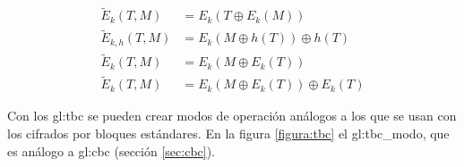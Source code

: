 \begin{align}
  \label{tbc_trivial}
  \tilde{E}_k(T, M) &= E_k(T \oplus E_k(M)) \\
  \label{tbc_lrw}
  \tilde{E}_{k, h}(T, M) &= E_k(M \oplus h(T)) \oplus h(T) \\
  \label{tbc_we}
  \tilde{E}_{k}(T, M) &= E_k(M \oplus E_k(T)) \\
  \label{tbc_xex}
  \tilde{E}_{k}(T, M) &= E_k(M \oplus E_k(T)) \oplus E_k(T)
\end{align}


Con los \gls{gl:tbc} se pueden crear modos de operación análogos a los que se
usan con los cifrados por bloques estándares. En la figura \ref{figura:tbc}
el \gls{gl:tbc_modo}, que es análogo a \gls{gl:cbc} (sección \ref{sec:cbc}).

